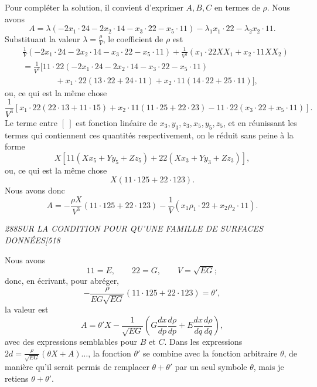 \documentclass[11pt]{article}
\newcommand{\phead}[3]{\noindent\textit{#1\hfill #2\hfill #3}\par\medskip}
\begin{document}
Pour compl\'eter la solution, il convient d'exprimer $A,B,C$ en termes de $\rho$.
Nous avons
\[
A=\lambda(-2x_1\cdot24-2x_2\cdot14-x_3\cdot22-x_5\cdot11)
-\lambda_1x_1\cdot22-\lambda_2x_2\cdot11.
\]
Substituant la valeur $\lambda=\frac{\rho}{V}$, le coefficient de $\rho$ est
\[
\begin{split}
&\frac{1}{V}(-2x_1\cdot24-2x_2\cdot14-x_3\cdot22-x_5\cdot11)
+\frac{1}{V^3}(x_1\cdot22XX_1+x_2\cdot11XX_2)\\
&=\frac{1}{V^3}[11\cdot22(-2x_1\cdot24-2x_2\cdot14-x_3\cdot22-x_5\cdot11)\\
&\qquad\qquad+x_1\cdot22(13\cdot22+24\cdot11)+x_2\cdot11(14\cdot22+25\cdot11)],
\end{split}
\]
ou, ce qui est la m\^eme chose
\[
\frac{1}{V^3}[x_1\cdot22(22\cdot13+11\cdot15)+x_2\cdot11(11\cdot25+22\cdot23)
-11\cdot22(x_3\cdot22+x_5\cdot11)].
\]
Le terme entre $[\ ]$ est fonction lin\'eaire de $x_3,y_3,z_3,x_5,y_5,z_5$, et
en r\'eunissant les termes qui contiennent ces quantit\'es respectivement, on le
r\'eduit sans peine \`a la forme
\[
X[11(Xx_5+Yy_5+Zz_5)+22(Xx_3+Yy_3+Zz_3)],
\]
ou, ce qui est la m\^eme chose
\[
X(11\cdot125+22\cdot123).
\]
Nous avons donc
\[
A=-\frac{\rho X}{V^3}(11\cdot125+22\cdot123)-\frac{1}{V}(x_1\rho_1\cdot22+x_2\rho_2\cdot11).
\]

\clearpage

\phead{288}{SUR LA CONDITION POUR QU'UNE FAMILLE DE SURFACES DONN\'EES}{[518}

Nous avons
\[
11=E,\qquad 22=G,\qquad V=\sqrt{EG};
\]
donc, en \'ecrivant, pour abr\'eger,
\[
-\frac{\rho}{EG\sqrt{EG}}(11\cdot125+22\cdot123)=\theta',
\]
la valeur est
\[
A=\theta'X-\frac{1}{\sqrt{EG}}\left(G\frac{dx}{dp}\frac{d\rho}{dp}
+E\frac{dx}{dq}\frac{d\rho}{dq}\right),
\]
avec des expressions semblables pour $B$ et $C$. Dans les expressions
$2d=\frac{\rho}{\sqrt{EG}}(\theta X+A)\ldots$, la fonction $\theta'$ se combine
avec la fonction arbitraire $\theta$, de mani\`ere qu'il serait permis de remplacer
$\theta+\theta'$ par un seul symbole $\theta$, mais je retiens $\theta+\theta'$.
\end{document}
